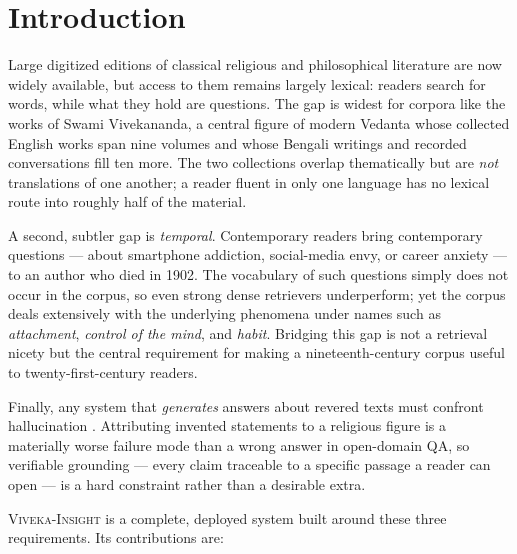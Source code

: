 \documentclass[11pt,a4paper]{article}
\newcommand{\system}{\textsc{Viveka-Insight}}
\begin{document}
\section{Introduction}

Large digitized editions of classical religious and philosophical
literature are now widely available, but access to them remains largely
lexical: readers search for words, while what they hold are questions.
The gap is widest for corpora like the works of Swami Vivekananda, a
central figure of modern Vedanta whose collected English works span nine
volumes and whose Bengali writings and recorded conversations fill ten
more. The two collections overlap thematically but are \emph{not}
translations of one another; a reader fluent in only one language has no
lexical route into roughly half of the material.

A second, subtler gap is \emph{temporal}. Contemporary readers bring
contemporary questions --- about smartphone addiction, social-media envy,
or career anxiety --- to an author who died in 1902. The vocabulary of
such questions simply does not occur in the corpus, so even strong dense
retrievers underperform; yet the corpus deals extensively with the
underlying phenomena under names such as \emph{attachment},
\emph{control of the mind}, and \emph{habit}. Bridging this gap is not a
retrieval nicety but the central requirement for making a
nineteenth-century corpus useful to twenty-first-century readers.

Finally, any system that \emph{generates} answers about revered texts
must confront hallucination \cite{ji2023survey}. Attributing invented
statements to a religious figure is a materially worse failure mode than
a wrong answer in open-domain QA, so verifiable grounding --- every claim
traceable to a specific passage a reader can open --- is a hard
constraint rather than a desirable extra.

\system{} is a complete, deployed system built around these three
requirements. Its contributions are:
\end{document}
